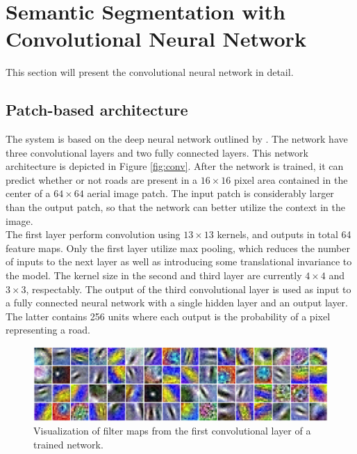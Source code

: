 \section{Semantic Segmentation with Convolutional Neural Network}
\label{sec:network}
This section will present the convolutional neural network in detail. 

\subsection{Patch-based architecture}

The system is based on the deep neural network outlined by \cite{Mnih_aerial_images_noisy}. The network have three convolutional layers and two fully connected layers. This network architecture is depicted in Figure \ref{fig:conv}. After the network is trained, it can predict whether or not roads are present in a $16 \times 16$ pixel area contained in the center of a $64 \times 64$ aerial image patch. The input patch is considerably larger than the output patch, so that the network can better utilize the context in the image. \\

The first layer perform convolution using $13 \times 13$ kernels, and outputs in total 64 feature maps. Only the first layer utilize max pooling, which reduces the number of inputs to the next layer as well as introducing some translational invariance to the model. The kernel size in the second and third layer are currently $4 \times 4$ and $3 \times 3$, respectably. The output of the third convolutional layer is used as input to a fully connected neural network with a single hidden layer and an output layer. The latter contains 256 units where each output is the probability of a pixel representing a road.\\

\begin{figure}
\begin{center}
\includegraphics[width=1\columnwidth]{figs/network/Filter_unblurred.png}
\caption[Visualization of filter map]{Visualization of filter maps from the first convolutional layer of a trained network.}
\label{fig:convoluional_first_layer_visualization}
\end{center}
\end{figure}

